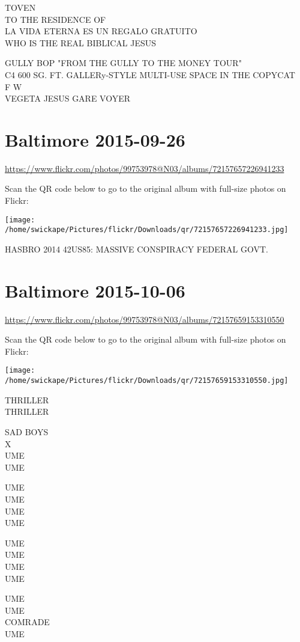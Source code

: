 \documentclass[10pt,letterpaper]{article}
\begin{document}
TOVEN\\
TO THE RESIDENCE OF\\
LA VIDA ETERNA ES UN REGALO GRATUITO\\
WHO IS THE REAL BIBLICAL JESUS

GULLY BOP "FROM THE GULLY TO THE MONEY TOUR"\\
C4 600 SG. FT. GALLERy{-}STYLE MULTI{-}USE SPACE IN THE COPYCAT\\
F W\\
VEGETA JESUS GARE VOYER


\section*{Baltimore 2015-09-26}

\url{https://www.flickr.com/photos/99753978@N03/albums/72157657226941233}

Scan the QR code below to go to the original album with full-size photos on Flickr:

\texttt{[image: /home/swickape/Pictures/flickr/Downloads/qr/72157657226941233.jpg]}


HASBRO 2014 42US85: MASSIVE CONSPIRACY FEDERAL GOVT.


\section*{Baltimore 2015-10-06}

\url{https://www.flickr.com/photos/99753978@N03/albums/72157659153310550}

Scan the QR code below to go to the original album with full-size photos on Flickr:

\texttt{[image: /home/swickape/Pictures/flickr/Downloads/qr/72157659153310550.jpg]}


THRILLER\\
THRILLER

SAD BOYS\\
X\\
UME\\
UME

UME\\
UME\\
UME\\
UME

UME\\
UME\\
UME\\
UME

UME\\
UME\\
COMRADE\\
UME
\end{document}
